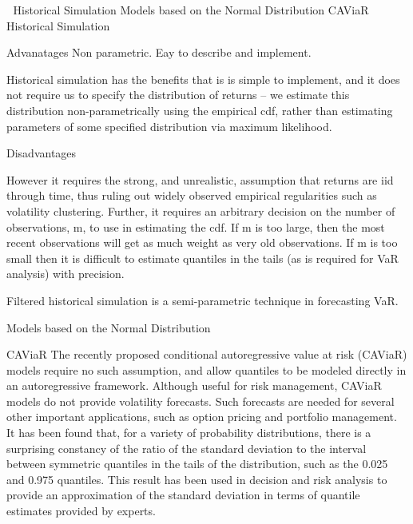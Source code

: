 

Historical Simulation
Models based on the Normal Distribution
CAViaR
Historical Simulation

Advanatages
Non parametric. Eay to describe and implement.

Historical simulation has the beneﬁts that is is simple to implement, and it does not require us to specify the distribution of returns – we estimate this distribution non-parametrically using the empirical cdf, rather than estimating parameters of some speciﬁed distribution via maximum likelihood.


Disadvantages

However it requires the strong, and unrealistic, assumption that returns are iid through time, thus ruling out widely observed empirical regularities such as volatility clustering. Further, it requires an arbitrary decision on the number of observations, m, to use in estimating the cdf. If m is too large, then the most recent observations will get as much weight as very old
observations. If m is too small then it is diﬃcult to estimate quantiles in the tails (as is required for VaR analysis) with precision.


Filtered historical simulation is a semi-parametric technique in forecasting VaR.

Models based on the Normal Distribution

CAViaR
The recently proposed conditional autoregressive value at risk (CAViaR) models require no such assumption, and allow quantiles to be modeled directly in an autoregressive framework. Although useful for risk management, CAViaR models do not provide volatility forecasts. Such forecasts are needed for several other important applications, such as option pricing and portfolio management. It has been found that, for a variety of probability distributions, there is a surprising constancy of the ratio of the standard deviation to the interval between symmetric quantiles in the tails of the distribution, such as the 0.025 and 0.975 quantiles. This result has been used in decision and risk analysis to provide an approximation of the standard deviation in terms of quantile estimates provided by experts. 



